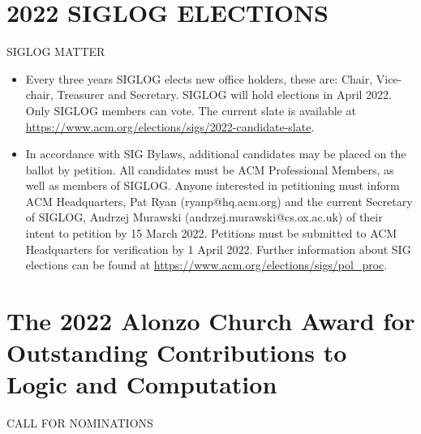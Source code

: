 \documentclass[prodmode,acmtecs]{acmsmall} %
\begin{document}
\section{2022 SIGLOG ELECTIONS}\label{2022SIGLOGELECTIONS}SIGLOG MATTER 

\begin{itemize}\item  Every three years SIGLOG elects new office holders, these are: Chair, Vice-chair, Treasurer and Secretary. SIGLOG will hold elections in April 2022. Only SIGLOG members can vote. The current slate is available at \href{https://www.acm.org/elections/sigs/2022-candidate-slate}{https://www.acm.org/elections/sigs/2022-candidate-slate}.  
 
\item  In accordance with SIG Bylaws, additional candidates may be placed on the ballot by petition. All candidates must be ACM Professional Members, as well as members of SIGLOG. Anyone interested in petitioning must inform ACM Headquarters, Pat Ryan (ryanp@hq.acm.org) and the current Secretary of SIGLOG, Andrzej Murawski (andrzej.murawski@cs.ox.ac.uk) of their intent to petition by 15 March 2022. Petitions must be submitted to ACM Headquarters for verification by 1 April 2022. Further information about SIG elections can be found at \href{https://www.acm.org/elections/sigs/pol_proc}{https://www.acm.org/elections/sigs/pol\_proc}.  
 
\end{itemize}\section{The 2022 Alonzo Church Award for Outstanding Contributions to Logic and Computation}\label{The2022AlonzoChurchAwardforOutstandingContributionstoLogicandComputation}CALL FOR NOMINATIONS 
\end{document}
